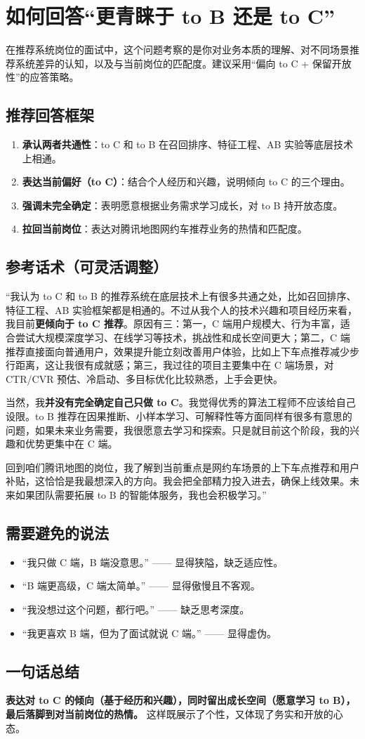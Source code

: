 \documentclass[12pt,a4paper]{article}
\begin{document}
\section{如何回答“更青睐于 to B 还是 to C”}

在推荐系统岗位的面试中，这个问题考察的是你对业务本质的理解、对不同场景推荐系统差异的认知，以及与当前岗位的匹配度。建议采用“偏向 to C + 保留开放性”的应答策略。

\subsection*{推荐回答框架}
\begin{enumerate}[label=(\arabic*)]
\item \textbf{承认两者共通性}：to C 和 to B 在召回排序、特征工程、AB 实验等底层技术上相通。
\item \textbf{表达当前偏好（to C）}：结合个人经历和兴趣，说明倾向 to C 的三个理由。
\item \textbf{强调未完全确定}：表明愿意根据业务需求学习成长，对 to B 持开放态度。
\item \textbf{拉回当前岗位}：表达对腾讯地图网约车推荐业务的热情和匹配度。
\end{enumerate}

\subsection*{参考话术（可灵活调整）}
“我认为 to C 和 to B 的推荐系统在底层技术上有很多共通之处，比如召回排序、特征工程、AB 实验框架都是相通的。不过从我个人的技术兴趣和项目经历来看，我目前\textbf{更倾向于 to C 推荐}。原因有三：第一，C 端用户规模大、行为丰富，适合尝试大规模深度学习、在线学习等技术，挑战性和成长空间更大；第二，C 端推荐直接面向普通用户，效果提升能立刻改善用户体验，比如上下车点推荐减少步行距离，这让我很有成就感；第三，我过往的项目主要集中在 C 端场景，对 CTR/CVR 预估、冷启动、多目标优化比较熟悉，上手会更快。

当然，我\textbf{并没有完全确定自己只做 to C}。我觉得优秀的算法工程师不应该给自己设限。to B 推荐在因果推断、小样本学习、可解释性等方面同样有很多有意思的问题，如果未来业务需要，我很愿意去学习和探索。只是就目前这个阶段，我的兴趣和优势更集中在 C 端。

回到咱们腾讯地图的岗位，我了解到当前重点是网约车场景的上下车点推荐和用户补贴，这恰恰是我最想深入的方向。我会把全部精力投入进去，确保上线效果。未来如果团队需要拓展 to B 的智能体服务，我也会积极学习。”

\subsection*{需要避免的说法}
\begin{itemize}
\item “我只做 C 端，B 端没意思。” —— 显得狭隘，缺乏适应性。
\item “B 端更高级，C 端太简单。” —— 显得傲慢且不客观。
\item “我没想过这个问题，都行吧。” —— 缺乏思考深度。
\item “我更喜欢 B 端，但为了面试就说 C 端。” —— 显得虚伪。
\end{itemize}

\subsection*{一句话总结}
\textbf{表达对 to C 的倾向（基于经历和兴趣），同时留出成长空间（愿意学习 to B），最后落脚到对当前岗位的热情。} 这样既展示了个性，又体现了务实和开放的心态。
\end{document}
